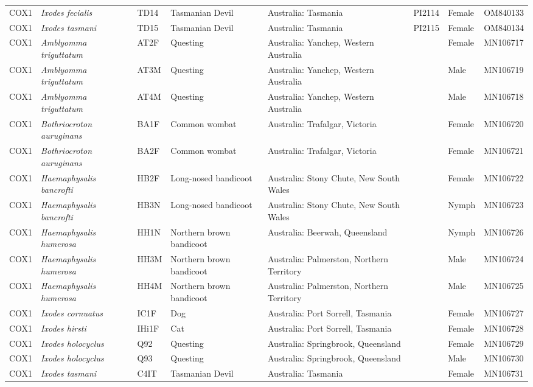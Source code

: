 \documentclass[a4paper, nobind]{templates/ociamthesis}
\begin{document}
\begin{landscape}
\begin{longtable}[t]{l>{}lllllll}
COX1 & \em{Ixodes fecialis} & TD14 & Tasmanian Devil & Australia: Tasmania & PI2114 & Female & OM840133\\
COX1 & \em{Ixodes tasmani} & TD15 & Tasmanian Devil & Australia: Tasmania & PI2115 & Female & OM840134\\
COX1 & \em{Amblyomma triguttatum} & AT2F & Questing & Australia: Yanchep, Western Australia &  & Female & MN106717\\
COX1 & \em{Amblyomma triguttatum} & AT3M & Questing & Australia: Yanchep, Western Australia &  & Male & MN106719\\
COX1 & \em{Amblyomma triguttatum} & AT4M & Questing & Australia: Yanchep, Western Australia &  & Male & MN106718\\
COX1 & \em{Bothriocroton auruginans} & BA1F & Common wombat & Australia: Trafalgar, Victoria &  & Female & MN106720\\
COX1 & \em{Bothriocroton auruginans} & BA2F & Common wombat & Australia: Trafalgar, Victoria &  & Female & MN106721\\
COX1 & \em{Haemaphysalis bancrofti} & HB2F & Long-nosed bandicoot & Australia: Stony Chute, New South Wales &  & Female & MN106722\\
COX1 & \em{Haemaphysalis bancrofti} & HB3N & Long-nosed bandicoot & Australia: Stony Chute, New South Wales &  & Nymph & MN106723\\
COX1 & \em{Haemaphysalis humerosa} & HH1N & Northern brown bandicoot & Australia: Beerwah, Queensland &  & Nymph & MN106726\\
COX1 & \em{Haemaphysalis humerosa} & HH3M & Northern brown bandicoot & Australia: Palmerston, Northern Territory &  & Male & MN106724\\
COX1 & \em{Haemaphysalis humerosa} & HH4M & Northern brown bandicoot & Australia: Palmerston, Northern Territory &  & Male & MN106725\\
COX1 & \em{Ixodes cornuatus} & IC1F & Dog & Australia: Port Sorrell, Tasmania &  & Female & MN106727\\
COX1 & \em{Ixodes hirsti} & IHi1F & Cat & Australia: Port Sorrell, Tasmania &  & Female & MN106728\\
COX1 & \em{Ixodes holocyclus} & Q92 & Questing & Australia: Springbrook, Queensland &  & Female & MN106729\\
COX1 & \em{Ixodes holocyclus} & Q93 & Questing & Australia: Springbrook, Queensland &  & Male & MN106730\\
COX1 & \em{Ixodes tasmani} & C4IT & Tasmanian Devil & Australia: Tasmania &  & Female & MN106731\\

\end{longtable}
\end{landscape}
\end{document}
